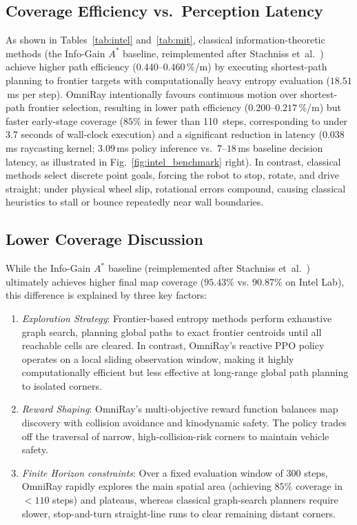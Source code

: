\documentclass[conference]{IEEEtran}
\begin{document}
\subsection{Coverage Efficiency vs.\ Perception Latency}
As shown in Tables~\ref{tab:intel} and~\ref{tab:mit}, classical information-theoretic methods (the Info-Gain $A^*$ baseline, reimplemented after Stachniss et~al.~\cite{stachniss2005}) achieve higher path efficiency ($0.440$--$0.460\,\%$/m) by executing shortest-path planning to frontier targets with computationally heavy entropy evaluation ($18.51$\,ms per step).
OmniRay intentionally favours continuous motion over shortest-path frontier selection, resulting in lower path efficiency ($0.200$--$0.217\,\%$/m) but faster early-stage coverage ($85\%$ in fewer than 110~steps, corresponding to under 3.7 seconds of wall-clock execution) and a significant reduction in latency ($0.038$\,ms raycasting kernel; $3.09$\,ms policy inference vs.\ $7$--$18$\,ms baseline decision latency, as illustrated in Fig.~\ref{fig:intel_benchmark} right).
In contrast, classical methods select discrete point goals, forcing the robot to stop, rotate, and drive straight; under physical wheel slip, rotational errors compound, causing classical heuristics to stall or bounce repeatedly near wall boundaries.

\subsection{Lower Coverage Discussion}
While the Info-Gain $A^*$ baseline (reimplemented after Stachniss et~al.~\cite{stachniss2005}) ultimately achieves higher final map coverage ($95.43\%$ vs. $90.87\%$ on Intel Lab), this difference is explained by three key factors:
\begin{enumerate}
    \item \textit{Exploration Strategy}: Frontier-based entropy methods perform exhaustive graph search, planning global paths to exact frontier centroids until all reachable cells are cleared. In contrast, OmniRay's reactive PPO policy operates on a local sliding observation window, making it highly computationally efficient but less effective at long-range global path planning to isolated corners.
    \item \textit{Reward Shaping}: OmniRay's multi-objective reward function balances map discovery with collision avoidance and kinodynamic safety. The policy trades off the traversal of narrow, high-collision-risk corners to maintain vehicle safety.
    \item \textit{Finite Horizon constraints}: Over a fixed evaluation window of 300 steps, OmniRay rapidly explores the main spatial area (achieving $85\%$ coverage in $<110$ steps) and plateaus, whereas classical graph-search planners require slower, stop-and-turn straight-line runs to clear remaining distant corners.
\end{enumerate}
\end{document}
